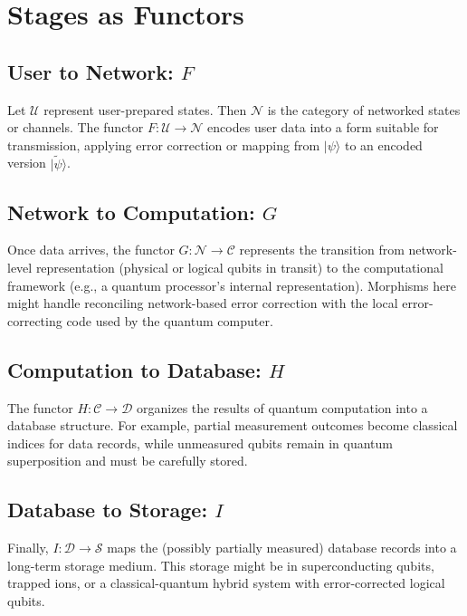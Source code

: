 \documentclass[12pt]{article}
\begin{document}
\section{Stages as Functors}

\subsection{User to Network: \texorpdfstring{\(F\)}{}}

Let \(\mathcal{U}\) represent user-prepared states. Then
\(\mathcal{N}\) is the category of networked states or channels.
The functor \(F: \mathcal{U} \to \mathcal{N}\) encodes user data
into a form suitable for transmission, applying error correction
or mapping from \(\vert \psi \rangle\) to an encoded version
\(\vert \tilde{\psi} \rangle\).

\subsection{Network to Computation: \texorpdfstring{\(G\)}{}}

Once data arrives, the functor \(G: \mathcal{N} \to \mathcal{C}\)
represents the transition from network-level representation
(physical or logical qubits in transit) to the computational
framework (e.g., a quantum processor’s internal representation).
Morphisms here might handle reconciling network-based error
correction with the local error-correcting code used by the
quantum computer.

\subsection{Computation to Database: \texorpdfstring{\(H\)}{}}

The functor \(H: \mathcal{C} \to \mathcal{D}\) organizes the
results of quantum computation into a database structure. For
example, partial measurement outcomes become classical indices
for data records, while unmeasured qubits remain in quantum
superposition and must be carefully stored.

\subsection{Database to Storage: \texorpdfstring{\(I\)}{}}

Finally, \(I: \mathcal{D} \to \mathcal{S}\) maps the (possibly
partially measured) database records into a long-term storage
medium. This storage might be in superconducting qubits, trapped
ions, or a classical-quantum hybrid system with error-corrected
logical qubits.
\end{document}
